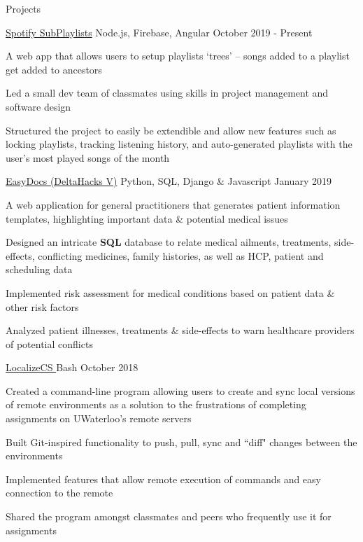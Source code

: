 \documentclass{resume} %
\begin{document}
\begin{rSection}{Projects}

    \begin{sideproject}
        {\href{https://walk-site.herokuapp.com/sub-playlists}{\faGlobe{} Spotify SubPlaylists}}
        {Node.js, Firebase, Angular}
        {October 2019 - Present}
        {
            \item A web app that allows users to setup playlists `trees' -- songs added to a playlist get added to ancestors
            \item Led a small dev team of classmates using skills in project management and software design
            \item Structured the project to easily be extendible and allow new features such as locking playlists, tracking listening history, and auto-generated playlists with the user's most played songs of the month
        }
    \end{sideproject}
    
    \vspace{1em}
    
    \begin{sideproject}
        {\href{https://github.com/wbhildeb/EasyDocs}{\faGithub{} EasyDocs (DeltaHacks V)}}
        {Python, SQL, Django \& Javascript}
        {January 2019}
        {
            \item A web application for general practitioners that generates patient information templates, highlighting important data \& potential medical issues
            \item Designed an intricate \textbf{SQL} database to relate medical ailments, treatments, side-effects, conflicting medicines, family histories, as well as HCP, patient and scheduling data
            \item Implemented risk assessment for medical conditions based on patient data \& other risk factors
            \item Analyzed patient illnesses, treatments \& side-effects to warn healthcare providers of potential conflicts
        }
    \end{sideproject}

    \vspace{1em}

    \begin{sideproject}
        {\href{https://github.com/wbhildeb/localize-cs}{\faGithub{} LocalizeCS }}
        {Bash}
        {October 2018}
        {
            \item Created a command-line program allowing users to create and sync local versions of remote environments as
            a solution to the frustrations of completing assignments on UWaterloo's remote servers
            \item Built Git-inspired functionality to push, pull, sync and ``diff" changes between the environments
            \item Implemented features that allow remote execution of commands and easy connection to the remote
            \item Shared the program amongst classmates and peers who frequently use it for assignments
        }
    \end{sideproject}
    

\end{rSection}
\end{document}
